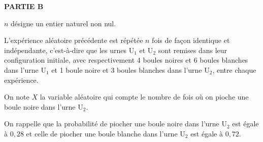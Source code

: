 \bigskip

\textbf{PARTIE B}

\medskip

$n$ désigne un entier naturel non nul.

L'expérience aléatoire précédente est répétée $n$ fois de façon identique et indépendante, c'est-à-dire que les urnes U$_1$ et U$_2$ sont remises dans leur configuration initiale, avec respectivement 4 boules noires et 6 boules blanches dans l'urne U$_1$ et 1 boule noire et 3 boules blanches dans l'urne U$_2$, entre chaque expérience.

On note $X$ la variable aléatoire qui compte le nombre de fois où on pioche une boule noire dans l'urne U$_2$.

On rappelle que la probabilité de piocher une boule noire dans l'urne U$_2$ est égale à $0,28$ et celle de piocher une boule blanche dans l'urne U$_2$ est égale à $0,72$.

\medskip


